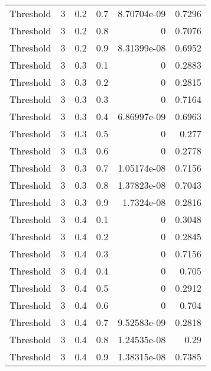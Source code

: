 \documentclass{article}
\begin{document}
\begin{longtable}[H]{lrrrrr}
 Threshold      &       3 &   0.2 &            0.7 &   8.70704e-09 &          0.7296 \\
 Threshold      &       3 &   0.2 &            0.8 &   0           &          0.7076 \\
 Threshold      &       3 &   0.2 &            0.9 &   8.31399e-08 &          0.6952 \\
 Threshold      &       3 &   0.3 &            0.1 &   0           &          0.2883 \\
 Threshold      &       3 &   0.3 &            0.2 &   0           &          0.2815 \\
 Threshold      &       3 &   0.3 &            0.3 &   0           &          0.7164 \\
 Threshold      &       3 &   0.3 &            0.4 &   6.86997e-09 &          0.6963 \\
 Threshold      &       3 &   0.3 &            0.5 &   0           &          0.277  \\
 Threshold      &       3 &   0.3 &            0.6 &   0           &          0.2778 \\
 Threshold      &       3 &   0.3 &            0.7 &   1.05174e-08 &          0.7156 \\
 Threshold      &       3 &   0.3 &            0.8 &   1.37823e-08 &          0.7043 \\
 Threshold      &       3 &   0.3 &            0.9 &   1.7324e-08  &          0.2816 \\
 Threshold      &       3 &   0.4 &            0.1 &   0           &          0.3048 \\
 Threshold      &       3 &   0.4 &            0.2 &   0           &          0.2845 \\
 Threshold      &       3 &   0.4 &            0.3 &   0           &          0.7156 \\
 Threshold      &       3 &   0.4 &            0.4 &   0           &          0.705  \\
 Threshold      &       3 &   0.4 &            0.5 &   0           &          0.2912 \\
 Threshold      &       3 &   0.4 &            0.6 &   0           &          0.704  \\
 Threshold      &       3 &   0.4 &            0.7 &   9.52583e-09 &          0.2818 \\
 Threshold      &       3 &   0.4 &            0.8 &   1.24535e-08 &          0.29   \\
 Threshold      &       3 &   0.4 &            0.9 &   1.38315e-08 &          0.7385 \\

\end{longtable}
\end{document}
